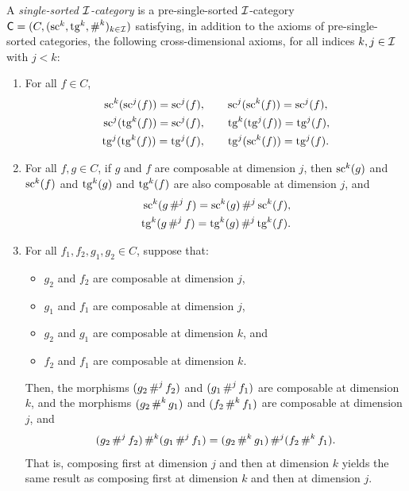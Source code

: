 \begin{definition}
  \label{def:SingleSortedCategory}
  \leanok
  A \emph{single-sorted $\mathcal{I}$-category} is a pre-single-sorted $\mathcal{I}$-category $\mathsf{C} = (C,
  (\operatorname{sc}^k, \operatorname{tg}^k, \operatorname{\#}^k)_{k \in \mathcal{I}})$ satisfying, in addition to the axioms of
  pre-single-sorted categories, the following cross-dimensional axioms, for all indices $k, j \in
  \mathcal{I}$ with $j < k$:

  \begin{enumerate}
    \item \label{ax:ss_cross_glob} For all $f \in C$,
      \begin{align*}
        \operatorname{sc}^k (\operatorname{sc}^j (f)) = \operatorname{sc}^j (f), \qquad & \operatorname{sc}^j (\operatorname{sc}^k (f)) = \operatorname{sc}^j (f), \\
        \operatorname{sc}^j (\operatorname{tg}^k (f)) = \operatorname{sc}^j (f), \qquad & \operatorname{tg}^k (\operatorname{tg}^j (f)) = \operatorname{tg}^j (f), \\
        \operatorname{tg}^j (\operatorname{tg}^k (f)) = \operatorname{tg}^j (f), \qquad & \operatorname{tg}^j (\operatorname{sc}^k (f)) = \operatorname{tg}^j (f).
      \end{align*}
    \item \label{ax:ss_cross_sc_tg_comp} For all $f, g \in C$, if $g$ and $f$ are composable at
      dimension $j$, then $\operatorname{sc}^k (g)$ and $\operatorname{sc}^k (f)$ and $\operatorname{tg}^k (g)$ and $\operatorname{tg}^k (f)$ are also
      composable at dimension $j$, and
      \begin{align*}
        \operatorname{sc}^k (g \operatorname{\#}^j f) = \operatorname{sc}^k (g) \operatorname{\#}^j \operatorname{sc}^k (f), \\
        \operatorname{tg}^k (g \operatorname{\#}^j f) = \operatorname{tg}^k (g) \operatorname{\#}^j \operatorname{tg}^k (f).
      \end{align*}
    \item \label{ax:ss_interchange} For all $f_1, f_2, g_1, g_2 \in C$, suppose that:
      \begin{itemize}
        \item $g_2$ and $f_2$ are composable at dimension $j$,
        \item $g_1$ and $f_1$ are composable at dimension $j$,
        \item $g_2$ and $g_1$ are composable at dimension $k$, and
        \item $f_2$ and $f_1$ are composable at dimension $k$.
      \end{itemize}
      Then, the morphisms $(g_2 \operatorname{\#}^j f_2)$ and $(g_1 \operatorname{\#}^j f_1)$ are composable at dimension
      $k$, and the morphisms $(g_2 \operatorname{\#}^k g_1)$ and $(f_2 \operatorname{\#}^k f_1)$ are composable at
      dimension $j$, and
      \[
        (g_2 \operatorname{\#}^j f_2) \operatorname{\#}^k (g_1 \operatorname{\#}^j f_1) = (g_2 \operatorname{\#}^k g_1) \operatorname{\#}^j (f_2
        \operatorname{\#}^k f_1).
      \]
      That is, composing first at dimension $j$ and then at dimension $k$ yields the same result as
      composing first at dimension $k$ and then at dimension $j$.
  \end{enumerate}
\end{definition}

